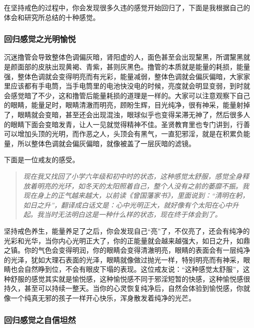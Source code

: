 在坚持戒色的过程中，你会发现很多久违的感觉开始回归了，下面是我根据自己的体会和研究所总结的十种感觉。

\subsubsection{回归感觉之光明愉悦}

沉迷撸管会导致整体色调偏灰暗，肾阳虚的人，面色甚至会出现黧黑，所谓黧黑就是颜面部的皮肤出现黄褐、青紫，甚则灰黑色。撸管的本质就是能量的耗损，能量强，整体色调就会变得明亮而有光彩，能量减弱，整体色调就会偏灰偏暗，大家家里应该都有手电筒，当手电筒里的电池快没电的时候，亮度就会明显变弱，到时就会感觉暗了不少，这和撸管后能量耗损的道理是一样的。大家可以注意观察下自己的眼睛，能量足时，眼睛清澈而明亮，顾盼生辉，目光纯净，很有神采，能量射掉了，眼睛就会变暗，甚至还会出现混浊，眼球似乎也变得呆滞无神了，然后很多人的眼睛下面会变暗发青，让人一见就觉得精神不佳。圣贤教育里也专门讲到，行善可以增加头顶的光明，而作恶之人，头顶会有黑气，一直犯邪淫，就是在积累负能量，所以整体色调就会偏灰偏暗，就像被盖了一层灰暗的滤镜。

下面是一位戒友的感受。

\begin{quote}\it
    现在我又找回了小学六年级和初中时的状态，这种感觉太舒服，感觉全身释放着明亮的光环，如冬天的太阳照着自己，整个人没有之前的萎靡不振。我现在身上的正气越来越大，以前读《曾国藩家书》，里面说到：“清明在躬，如日之升”，翻译成白话文是：心中光明正大，就好像有个太阳在心中升起。我当时无法明白这是一种什么样的状态，现在终于体会到了。
\end{quote}

坚持戒色养生，能量养足了之后，你会发现自己“亮”了，不仅亮了，还会有纯净的光彩和光华，当你内心光明正大了，你的正能量就会越来越强大，如日之升，如鼎之镇。你的气色会变得明润，你的眼睛会变得清澈明亮，眼睛的表面会有一层纯净的光泽，犹如大理石表面的光泽，眼睛就像做过抛光一样，特别明亮而有神采，眼睛也会自然睁到位，不会有眼皮下塌的表现。这位戒友说：“这种感觉太舒服”，这种舒服的感觉其实就是愉悦感，这种愉悦感不同于邪淫短暂的快感，这种愉悦感很持久，甚至可以持续一整天。当你的心灵恢复纯净后，自然会体验到愉悦感，你就像一个纯真无邪的孩子一样开心快乐，浑身散发着纯净的光芒。

\subsubsection{回归感觉之自信坦然}

